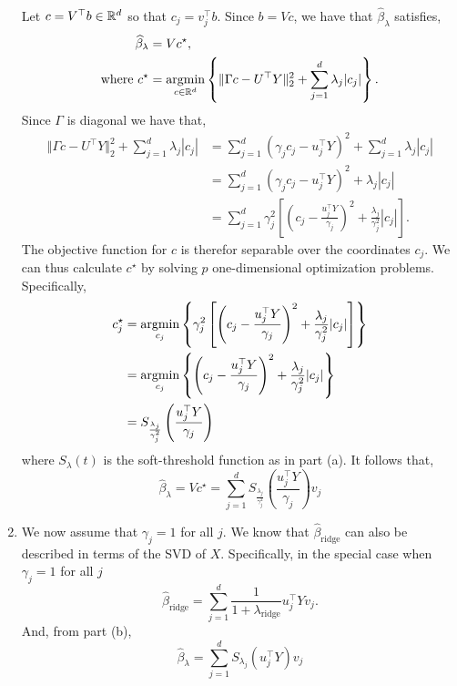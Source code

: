 \begin{enumerate}[label = (\alph*)]
\begin{align*}
    \end{align*}
    Let $c = V^\top b \in \mathbb{R}^d$ so that $c_j = v_j^\top b$. Since $b = Vc$, we have that $\hat{\beta}_\lambda$ satisfies,
    \begin{align*}
        \widehat{\beta}_\lambda &= Vc^\star,\\
        \text{where } c^\star &= \operatorname*{argmin}_{c \in \mathbb{R}^d} \left\{\Vert \Gamma c - U^\top Y \Vert_2^2 + \sum_{j=1}^d \lambda_j |c_j| \right\}. 
    \end{align*}
    Since $\Gamma$ is diagonal we have that,
    \begin{align*}
        \Vert \Gamma c - U^\top Y \Vert_2^2 + \sum_{j=1}^d \lambda_j |c_j|&=\sum_{j=1}^d \left(\gamma_j c_j - u_j^\top Y\right)^2 + \sum_{j=1}^d \lambda_j |c_j|\\
        &=\sum_{j=1}^d \left(\gamma_j c_j - u_j^\top Y\right)^2 + \lambda_j |c_j|\\
        &=\sum_{j=1}^d \gamma_j^2\left[\left(c_j - \frac{u_j^\top Y}{\gamma_j}\right)^2 + \frac{\lambda_j}{\gamma_j^2} |c_j|\right].
    \end{align*}
    The objective function for $c$ is therefor separable over the coordinates $c_j$. We can thus calculate $c^\star$ by solving $p$ one-dimensional optimization problems. Specifically,
    \begin{align*}
        c_j^\star &=\operatorname*{argmin}_{c_j} \left\{\gamma_j^2\left[\left(c_j - \frac{u_j^\top Y}{\gamma_j}\right)^2 + \frac{\lambda_j}{\gamma_j^2} |c_j|\right]\right\} \\
        &=\operatorname*{argmin}_{c_j}\left\{\left(c_j - \frac{u_j^\top Y}{\gamma_j}\right)^2 + \frac{\lambda_j}{\gamma_j^2}  |c_j|\right\}\\
        &= S_{\frac{\lambda_j}{\gamma_j^2}}\left(\frac{u_j^\top Y}{\gamma_j}\right)
    \end{align*} 
    where $S_\lambda(t)$ is the soft-threshold function as in part (a). It follows that,
    \[\widehat{\beta}_\lambda =Vc^\star = \sum_{j=1}^d  S_{\frac{\lambda_j}{\gamma_j^2}}\left(\frac{u_j^\top Y}{\gamma_j}\right) v_j \]
    \item We now assume that $\gamma_j=1$ for all $j$. We know that $\widehat{\beta}_{\mathrm{ridge}}$ can also be described in terms of the SVD of $X$. Specifically, in the special case when $\gamma_j=1$ for all $j$
    \[\widehat{\beta}_{\mathrm{ridge}} = \sum_{j=1}^d \frac{1}{1+\lambda_{\mathrm{ridge}}} u_j^\top Y v_j. \] 
    And, from part (b),
    \[\widehat{\beta}_\lambda = \sum_{j=1}^d  S_{\lambda_j}\left(u_j^\top Y\right) v_j\]

\end{enumerate}
